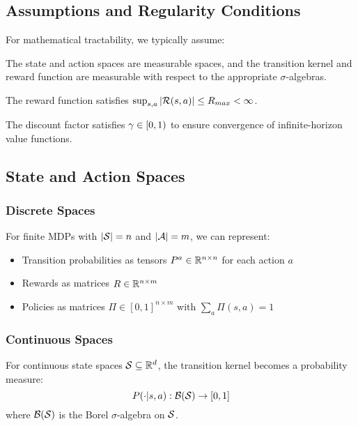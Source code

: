 \subsection{Assumptions and Regularity Conditions}

For mathematical tractability, we typically assume:

\begin{assumption}[Measurability]
The state and action spaces are measurable spaces, and the transition kernel and reward function are measurable with respect to the appropriate $\sigma$-algebras.
\end{assumption}

\begin{assumption}
The reward function satisfies $\sup_{s,a} |\mathcal{R}(s,a)| \leq R_{max} < \infty$.
\end{assumption}

\begin{assumption}
The discount factor satisfies $\gamma \in [0,1)$ to ensure convergence of infinite-horizon value functions.
\end{assumption}

\subsection{State and Action Spaces}

\subsubsection{Discrete Spaces}

For finite MDPs with $|\mathcal{S}| = n$ and $|\mathcal{A}| = m$, we can represent:
\begin{itemize}
    \item Transition probabilities as tensors $P^a \in \mathbb{R}^{n \times n}$ for each action $a$
    \item Rewards as matrices $R \in \mathbb{R}^{n \times m}$
    \item Policies as matrices $\Pi \in [0,1]^{n \times m}$ with $\sum_a \Pi(s,a) = 1$
\end{itemize}

\subsubsection{Continuous Spaces}

For continuous state spaces $\mathcal{S} \subseteq \mathbb{R}^d$, the transition kernel becomes a probability measure:
\begin{equation}
P(\cdot|s,a): \mathcal{B}(\mathcal{S}) \to [0,1]
\end{equation}
where $\mathcal{B}(\mathcal{S})$ is the Borel $\sigma$-algebra on $\mathcal{S}$.

